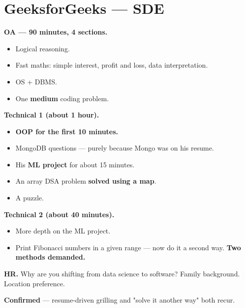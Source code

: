 \documentclass[11pt,a4paper]{article}
\newcommand{\tg}[1]{\textcolor{tag}{\textbf{\footnotesize #1}}}
\newcommand{\rnd}[1]{\textcolor{accent}{\textbf{#1}}}
\newcommand{\q}[1]{\textcolor{qcol}{#1}}
\newcommand{\card}[1]{%
  \par\vspace{5pt}%
  \noindent\colorbox{soft}{%
    \parbox{\dimexpr\textwidth-2\fboxsep}{\vspace{6pt}#1\vspace{6pt}}%
  }\par\vspace{7pt}%
}
\begin{document}
\section{GeeksforGeeks --- SDE}
\card{
\rnd{OA --- 90 minutes, 4 sections.}
\begin{itemize}
  \item Logical reasoning.
  \item Fast maths: simple interest, profit and loss, data interpretation.
  \item OS + DBMS.
  \item One \textbf{medium} coding problem.
\end{itemize}
\vspace{3pt}
\rnd{Technical 1 (about 1 hour).}
\begin{itemize}
  \item \textbf{OOP for the first 10 minutes.}
  \item \q{MongoDB} questions --- purely because Mongo was on his resume.
  \item His \textbf{ML project} for about 15 minutes.
  \item An array DSA problem \textbf{solved using a map}.
  \item A puzzle.
\end{itemize}
\vspace{3pt}
\rnd{Technical 2 (about 40 minutes).}
\begin{itemize}
  \item More depth on the ML project.
  \item \q{Print Fibonacci numbers in a given range --- now do it a second way.} \textbf{Two methods demanded.}
\end{itemize}
\vspace{3pt}
\rnd{HR.} \q{Why are you shifting from data science to software?} \quad Family background. \quad Location preference.
}
\tg{Confirmed} --- resume-driven grilling and "solve it another way" both recur.
\end{document}
